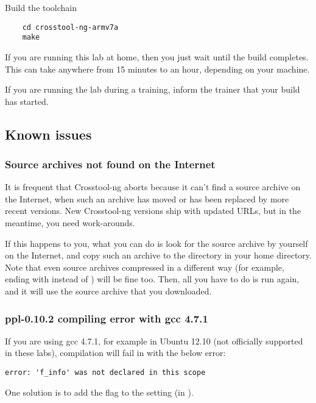 Build the toolchain

\begin{verbatim}
	cd crosstool-ng-armv7a
	make
\end{verbatim}

If you are running this lab at home, then you just wait until the build completes.
This can take anywhere from 15 minutes to an hour, depending on your machine.

If you are running the lab during a training, inform the trainer that your build has started.
\clearpage
\subsection{Known issues}

\subsubsection{Source archives not found on the Internet}

It is frequent that Crosstool-ng aborts because it can't find a
source archive on the Internet, when such an archive has moved or has
been replaced by more recent versions. New Crosstool-ng versions ship
with updated URLs, but in the meantime, you need work-arounds.

If this happens to you, what you can do is look for the source archive by
yourself on the Internet, and copy such an archive to the 
directory in your home directory. Note that even source archives
compressed in a different way (for example, ending with 
instead of ) will be fine too. Then, all you have to do is run
 again, and it will use the source archive that you
downloaded.

\subsubsection{ppl-0.10.2 compiling error with gcc 4.7.1}

If you are using gcc 4.7.1, for example in Ubuntu 12.10 (not officially
supported in these labs), compilation will fail in  with
the below error:

\begin{verbatim}
error: 'f_info' was not declared in this scope
\end{verbatim}

One solution is to add the  flag to the
 setting (in ). 
\clearpage

